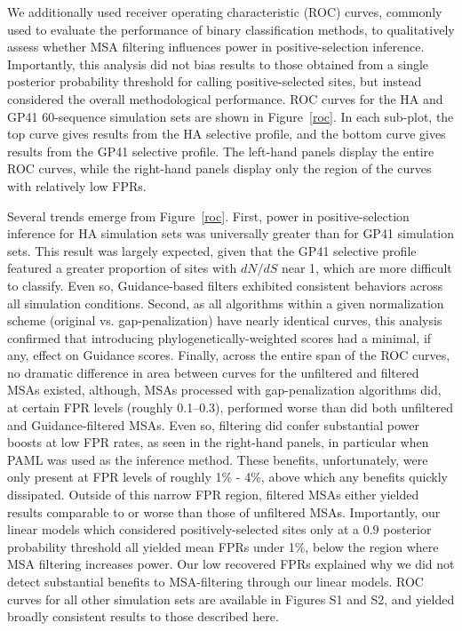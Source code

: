 \documentclass[11pt]{article}
\begin{document}
We additionally used receiver operating characteristic (ROC) curves, commonly used to evaluate the performance of binary classification methods, to qualitatively assess whether MSA filtering influences power in positive-selection inference. Importantly, this analysis did not bias results to those obtained from a single posterior probability threshold for calling positive-selected sites, but instead considered the overall methodological performance. ROC curves for the HA and GP41 60-sequence simulation sets are shown in Figure~\ref{roc}. In each sub-plot, the top curve gives results from the HA selective profile, and the bottom curve gives results from the GP41 selective profile. The left-hand panels display the entire ROC curves, while the right-hand panels display only the region of the curves with relatively low FPRs. 

Several trends emerge from Figure~\ref{roc}. First, power in positive-selection inference for HA simulation sets was universally greater than for GP41 simulation sets. This result was largely expected, given that the GP41 selective profile featured a greater proportion of sites with $dN/dS$ near 1, which are more difficult to classify. Even so, Guidance-based filters exhibited consistent behaviors across all simulation conditions. Second, as all algorithms within a given normalization scheme (original vs. gap-penalization) have nearly identical curves, this analysis confirmed that introducing phylogenetically-weighted scores had a minimal, if any, effect on Guidance scores. Finally, across the entire span of the ROC curves, no dramatic difference in area between curves for the unfiltered and filtered MSAs existed, although, MSAs processed with gap-penalization algorithms did, at certain FPR levels (roughly 0.1--0.3), performed worse than did both unfiltered and Guidance-filtered MSAs. Even so, filtering did confer substantial power boosts at low FPR rates, as seen in the right-hand panels, in particular when PAML was used as the inference method. These benefits, unfortunately, were only present at FPR levels of roughly 1\% - 4\%, above which any benefits quickly dissipated. Outside of this narrow FPR region, filtered MSAs either yielded results comparable to or worse than those of unfiltered MSAs. Importantly, our linear models which considered positively-selected sites only at a $0.9$ posterior probability threshold all yielded mean FPRs under 1\%, below the region where MSA filtering increases power. Our low recovered FPRs explained why we did not detect substantial benefits to MSA-filtering through our linear models. ROC curves for all other simulation sets are available in Figures S1 and S2, and yielded broadly consistent results to those described here.
\end{document}
